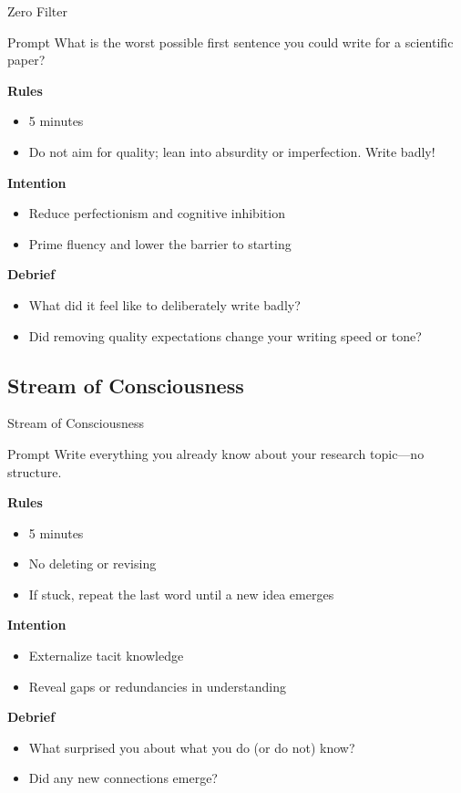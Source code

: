 \documentclass{beamer}
\begin{document}
\begin{frame}{Zero Filter}
\begin{block}{Prompt}
What is the worst possible first sentence you could write for a scientific paper?
\end{block}

\vspace{0.8em}
\textbf{Rules}
\begin{itemize}
    \item 5 minutes
    \item Do not aim for quality; lean into absurdity or imperfection.  Write badly!

\end{itemize}

\textbf{Intention}
\begin{itemize}
    \item Reduce perfectionism and cognitive inhibition
    \item Prime fluency and lower the barrier to starting
\end{itemize}

\textbf{Debrief}
\begin{itemize}
    \item What did it feel like to deliberately write badly?
    \item Did removing quality expectations change your writing speed or tone?
\end{itemize}
\end{frame}

\subsection{Stream of Consciousness}

\begin{frame}{Stream of Consciousness}
\begin{block}{Prompt}
Write everything you already know about your research topic---no structure.
\end{block}

\vspace{0.8em}
\textbf{Rules}
\begin{itemize}
    \item 5 minutes
    \item No deleting or revising
    \item If stuck, repeat the last word until a new idea emerges
\end{itemize}

\textbf{Intention}
\begin{itemize}
    \item Externalize tacit knowledge
    \item Reveal gaps or redundancies in understanding
\end{itemize}

\textbf{Debrief}
\begin{itemize}
    \item What surprised you about what you do (or do not) know?
    \item Did any new connections emerge?
\end{itemize}
\end{frame}
\end{document}
